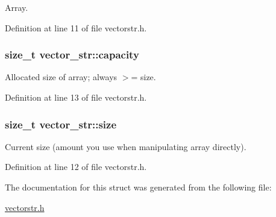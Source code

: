 \-Array. 



\-Definition at line 11 of file vectorstr.\-h.

\hypertarget{structvector__str_a8a52905a505acbcb9176be3eb6cf37f8}{
\subsubsection[{capacity}]{\setlength{\rightskip}{0pt plus 5cm}size\-\_\-t {\bf vector\-\_\-str\-::capacity}}}\label{structvector__str_a8a52905a505acbcb9176be3eb6cf37f8}


\-Allocated size of array; always $>$= size. 



\-Definition at line 13 of file vectorstr.\-h.

\hypertarget{structvector__str_a63d4c1a5373481aa4ba9d4ee8252c748}{
\subsubsection[{size}]{\setlength{\rightskip}{0pt plus 5cm}size\-\_\-t {\bf vector\-\_\-str\-::size}}}\label{structvector__str_a63d4c1a5373481aa4ba9d4ee8252c748}


\-Current size (amount you use when manipulating array directly). 



\-Definition at line 12 of file vectorstr.\-h.



\-The documentation for this struct was generated from the following file\-:\begin{DoxyCompactItemize}
\item 
\hyperlink{vectorstr_8h}{vectorstr.\-h}\end{DoxyCompactItemize}
